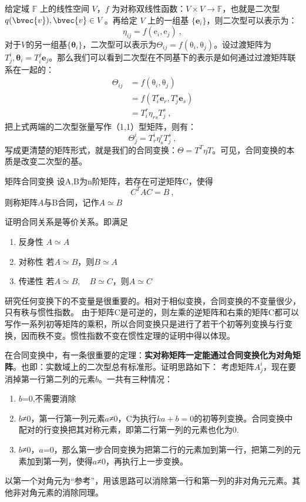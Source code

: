 
给定域 $\mathbb F$ 上的线性空间 $V$，$f$ 为对称双线性函数：$V\times V\to \mathbb F$，也就是二次型 $q(\bvec{v}),\bvec{v}\in V$。再给定 $V$ 上的一组基 $\{\boldsymbol e_i\}$，则二次型可以表示为：
\begin{equation}
\eta_{ij}=f(\boldsymbol {\mathrm e}_i,\boldsymbol {\mathrm e}_j)~,
\end{equation}
对于$V$的另一组基$\{\boldsymbol \theta_i\}$，二次型可以表示为$\Theta_{ij}=f(\boldsymbol {\mathrm \theta}_{i},\boldsymbol {\mathrm \theta}_{j})$。设过渡矩阵为$T^i_j,\boldsymbol {\theta}_i=T^j_i\boldsymbol e_j$。那么我们可以看到二次型在不同基下的表示是如何通过过渡矩阵联系在一起的：
\begin{equation}
\begin{aligned}
\Theta_{ij}&=f(\boldsymbol {\mathrm \theta}_{i},\boldsymbol {\mathrm \theta}_{j})\\
&=f(T^r_i\boldsymbol e_r,T^s_j\boldsymbol e_s)\\
&=T^r_i \eta_{rs}T^s_j~,
\end{aligned}
\end{equation}
把上式两端的二次型张量写作（1,1）型矩阵，则有：
$$\Theta^i_j=T^i_r\eta^r_sT^s_j~,$$
写成更清楚的矩阵形式，就是我们的合同变换：$\Theta=T^T\eta T$。可见，合同变换的本质是改变二次型的基。
\begin{definition}{矩阵合同变换}
设A,B为n阶矩阵，若存在可逆矩阵C，使得
\begin{equation}
C^TAC=B~,
\end{equation}
则称矩阵$A$与B合同，记作$A\simeq B$
\end{definition}
\begin{exercise}{}
证明合同关系是等价关系。即满足
\begin{enumerate}
\item 反身性  $A\simeq A$
\item 对称性  若$A\simeq B$，则$B\simeq A$
\item 传递性  若$A\simeq B,\quad B\simeq C$，则$A\simeq C$
\end{enumerate}
\end{exercise}
研究任何变换下的不变量是很重要的。相对于相似变换，合同变换的不变量很少，只有秩与惯性指数。
由于矩阵C是可逆的，则左乘的逆矩阵和右乘的矩阵C都可以写作一系列初等矩阵的乘积，所以合同变换只是进行了若干个初等列变换与行变换，因而秩不变。惯性指数不变在惯性定理的证明中得以体现。

在合同变换中，有一条很重要的定理：\textbf{实对称矩阵一定能通过合同变换化为对角矩阵}。也即：实数域上的二次型总有标准形。证明思路如下：
考虑矩阵$A^i_j$，现在要消掉第一行第二列的元素$b$。一共有三种情况：
\begin{enumerate}
\item $b$=0,不需要消除
\item $b$≠0，第一行第一列元素$a$≠0，C为执行$ka+b=0$的初等列变换。合同变换中配对的行变换把其对称元素，即第二行第一列的元素也化为0.
\item $b$≠0，$a$=0，那么第一步合同变换为把第二行的元素加到第一行，把第二列的元素加到第一列，使得$a$≠0，再执行上一步变换。
\end{enumerate}
以第一个对角元为“参考”，用该思路可以消除第一行和第一列的非对角元元素。其他非对角元素的消除同理。

